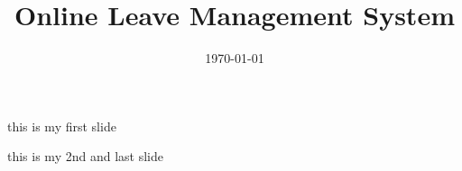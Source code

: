 \documentclass[default]{beamer}
\title[OLM]{Online Leave Management System}
\subtitle[Presentation]{}
\date{\today}
\author[Group 2]{}
\institute[MEC]{Govt. Model Engineering College,Thrikakkara}
\begin{document}
		
	\frame{\maketitle}	
	
	\begin{frame}
	this is my first slide
	\end{frame}
	
	\begin{frame}
	this is my 2nd and last slide
	\end{frame}
\end{document}
